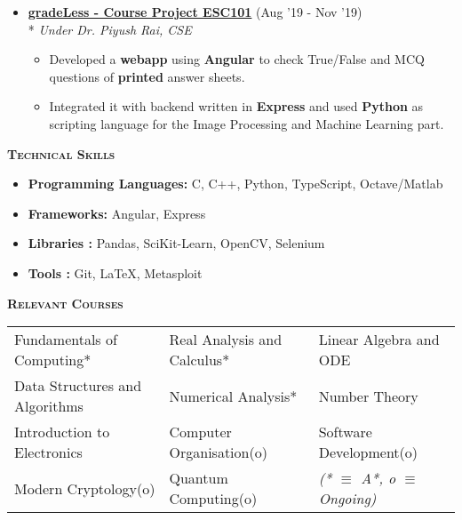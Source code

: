 \documentclass{article}
\begin{document}
\begin{itemize}[topsep=8pt,itemsep=3pt, partopsep =2pt, parsep =3pt]
\begin{itemize}
    \end{itemize}
    \vspace{-2mm}
    \item \href{https://github.com/SarthakRout/gradeLess} {\textbf {gradeLess - Course Project  ESC101}} \hfill { (Aug '19 - Nov '19)} \\* \textit{Under Dr. Piyush Rai, CSE} 
    \vspace{-2mm}
    \begin{itemize}
        \item Developed a \textbf{webapp} using \textbf{Angular} to check        True/False and MCQ questions of \textbf{printed} answer sheets.
        \item Integrated it with backend written in \textbf{Express} and used \textbf{Python} as scripting language for the Image Processing and Machine Learning part.
    \end{itemize}
    \vspace{-2mm}
\end{itemize}

\noindent\colorbox{shadecolor}
{\parbox{\dimexpr\textwidth-2\fboxsep\relax}{\textsc{\textbf{Technical Skills}}}}
\begin{multicols}{2}
    \begin{itemize}[topsep=5pt,itemsep=2pt, partopsep =2pt, parsep =2pt]
    \item \textbf{Programming Languages: } C, C++, Python, TypeScript, Octave/Matlab
    \item \textbf{Frameworks:} Angular, Express
    \item \textbf{Libraries :} Pandas, SciKit-Learn, OpenCV, Selenium
     \item \textbf{Tools :} Git, \LaTeX, Metasploit
\end{itemize}
\end{multicols}
\vspace{-3mm}
\noindent\colorbox{shadecolor}
{\parbox{\dimexpr\textwidth-2\fboxsep\relax}{\textsc{\textbf{Relevant Courses}}}}
\begin{table}[H]
    \vspace{-3mm}
    \begin{center}
    \vspace*{-1mm}
        \begin{tabular}{p{6cm} p{6cm} p{6cm} }
        Fundamentals of Computing* & Real Analysis and Calculus* & Linear Algebra and ODE \\*
        Data Structures and Algorithms & Numerical Analysis* & Number Theory\\* Introduction to Electronics  & Computer Organisation(o) & Software Development(o) \\* Modern Cryptology(o) & Quantum Computing(o) & \textit{ (* $\equiv$ A*, o $\equiv$ Ongoing)}
        \end{tabular}
    \vspace*{-7mm}
    \end{center}
\end{table}
\end{document}
